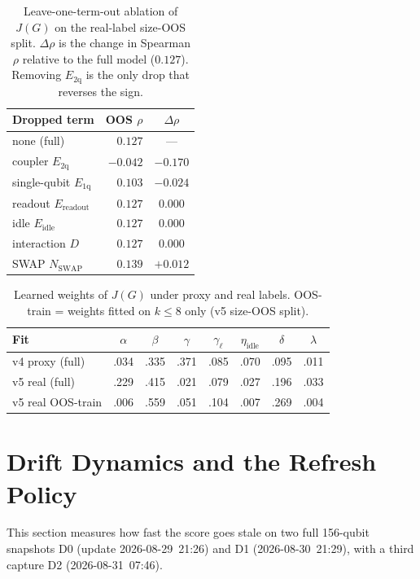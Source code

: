 \documentclass[journal,10pt,twocolumn]{IEEEtran}
\begin{document}
\begin{table}[t]
\caption{Leave-one-term-out ablation of $J(G)$ on the real-label size-OOS split. $\Delta\rho$ is the change in
Spearman $\rho$ relative to the full model ($0.127$). Removing $E_{\mathrm{2q}}$ is the only drop that reverses
the sign.}
\label{tab:jabl}
\centering
\footnotesize
\setlength{\tabcolsep}{3pt}
\begin{tabular}{@{}lrc@{}}
\toprule
Dropped term & OOS $\rho$ & $\Delta\rho$\\
\midrule
none (full) & $0.127$ & ---\\
coupler $E_{\mathrm{2q}}$ & $-0.042$ & $-0.170$\\
single-qubit $E_{\mathrm{1q}}$ & $0.103$ & $-0.024$\\
readout $E_{\mathrm{readout}}$ & $0.127$ & $0.000$\\
idle $E_{\mathrm{idle}}$ & $0.127$ & $0.000$\\
interaction $D$ & $0.127$ & $0.000$\\
SWAP $N_{\mathrm{SWAP}}$ & $0.139$ & $+0.012$\\
\bottomrule
\end{tabular}
\end{table}

\begin{table}[t]
\caption{Learned weights of $J(G)$ under proxy and real labels. OOS-train = weights fitted on $k\le8$ only
(v5 size-OOS split).}
\label{tab:wgts}
\centering
\footnotesize
\setlength{\tabcolsep}{3pt}
\begin{tabular}{@{}lccccccc@{}}
\toprule
Fit & $\alpha$ & $\beta$ & $\gamma$ & $\gamma_{\ell}$ & $\eta_{\mathrm{idle}}$ & $\delta$ & $\lambda$\\
\midrule
v4 proxy (full) & .034 & .335 & .371 & .085 & .070 & .095 & .011\\
v5 real (full)  & .229 & .415 & .021 & .079 & .027 & .196 & .033\\
v5 real OOS-train & .006 & .559 & .051 & .104 & .007 & .269 & .004\\
\bottomrule
\end{tabular}
\end{table}

\section{Drift Dynamics and the Refresh Policy}
\label{sec:drift}
This section measures how fast the score goes stale on two full 156-qubit snapshots D0 (update 2026-08-29~21:26)
and D1 (2026-08-30~21:29), with a third capture D2 (2026-08-31~07:46).
\end{document}
